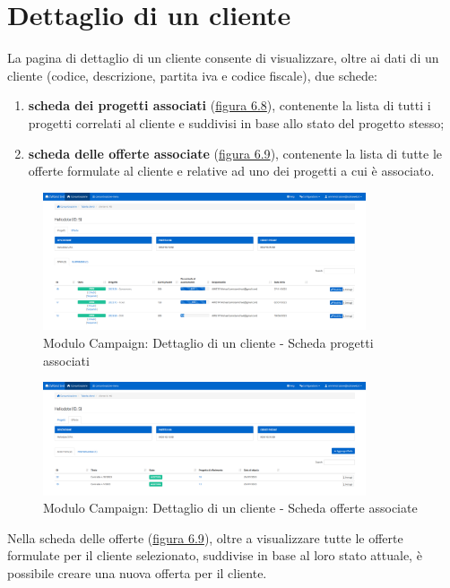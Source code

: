 \section{Dettaglio di un cliente}
\noindent La pagina di dettaglio di un cliente consente di visualizzare, oltre ai dati di un cliente (codice, descrizione, partita iva e codice fiscale), due schede:
\begin{enumerate}
\item \textbf{scheda dei progetti associati} ({\hyperref[fig:dettaglioCliente1]{figura 6.8}}), contenente la lista di tutti i progetti correlati al cliente e suddivisi in base allo stato del progetto stesso;
\item \textbf{scheda delle offerte associate} ({\hyperref[fig:dettaglioCliente2]{figura 6.9}}), contenente la lista di tutte le offerte formulate al cliente e relative ad uno dei progetti a cui è associato.
\end{enumerate}

\begin{figure}[!h]
\centering
\includegraphics[width=360px]{../images/UI/09-dettaglioClienteTab1.png}
\caption{Modulo Campaign: Dettaglio di un cliente - Scheda progetti associati}
\label{fig:dettaglioCliente1}
\end{figure} 

\begin{figure}[!h]
\centering
\includegraphics[width=360px]{../images/UI/09-dettaglioClienteTab2.png}
\caption{Modulo Campaign: Dettaglio di un cliente - Scheda offerte associate}
\label{fig:dettaglioCliente2}
\end{figure}

\noindent Nella scheda delle offerte ({\hyperref[fig:dettaglioCliente2]{figura 6.9}}), oltre a visualizzare tutte le offerte formulate per il cliente selezionato, suddivise in base al loro stato attuale, è possibile creare una nuova offerta per il cliente.

